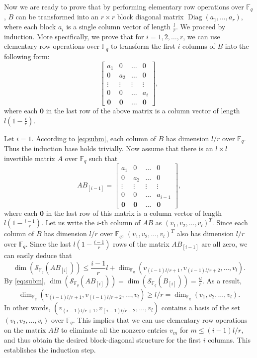 \documentclass[11pt,onecolumn]{IEEEtran}
\newcommand{\cS}{\mathcal{S}}
\DeclareMathOperator{\Diag}{Diag}
\begin{document}
Now we are ready to prove that by performing elementary row operations over $\mathbb{F}_q$, $B$ can be transformed into an $r\times r$ block diagonal matrix $\Diag(a_1,\dots,a_r)$, where each block $a_i$ is a single column vector of length $\frac{l}{r}$. 
We proceed by induction.
More specifically, we prove that for $i=1,2,\dots,r$, we can use elementary row operations over $\mathbb{F}_q$ to transform the first $i$ columns of $B$ into the following form:
$$
\left[
\begin{array}{cccc}
a_1 & 0 & \dots & 0 \\
0 & a_2 & \dots & 0 \\
\vdots & \vdots & \vdots & \vdots \\
0 & 0 & \dots & a_i \\
\mathbf{0} & \mathbf{0} & \dots & \mathbf{0}
\end{array}
\right],
$$
where each $\mathbf{0}$ in the last row of the above matrix is a column vector of length $l(1-\frac{i}{r})$.

Let $i=1.$ According to \eqref{eq:subm}, each column of $B$ has dimension $l/r$ over $\mathbb{F}_q$. Thus the induction base holds trivially.
Now assume that there is an $l \times l$ invertible matrix $A$ over $\mathbb{F}_q$ such that
$$
A B_{[i-1]}=
\left[
\begin{array}{cccc}
a_1 & 0 & \dots & 0 \\
0 & a_2 & \dots & 0 \\
\vdots & \vdots & \vdots & \vdots \\
0 & 0 & \dots & a_{i-1} \\
\mathbf{0} & \mathbf{0} & \dots & \mathbf{0}
\end{array}
\right],
$$
where each $\mathbf{0}$ in the last row of this matrix is a column vector of length $l(1-\frac{i-1}{r})$.
Let us write the $i$-th column of $AB$ as $(v_1,v_2,\dots,v_l)^T$. 
Since each column of $B$ has dimension $l/r$ over $\mathbb{F}_q$,
$(v_1,v_2,\dots,v_l)^T$ also has dimension $l/r$ over $\mathbb{F}_q$.
Since the last $l(1-\frac{i-1}{r})$ rows of the matrix $A B_{[i-1]}$ are all zero, we can easily deduce that 
   $$
\dim(\cS_{\mathbb{F}_q}(AB_{[i]})) \le \frac{i-1}{r}l + 
\dim_{\mathbb{F}_q}(v_{(i-1)l/r+1}, v_{(i-1)l/r+2}, \dots, v_l).
   $$
By \eqref{eq:subm}, $\dim(\cS_{\mathbb{F}_q}(AB_{[i]}))=\dim(\cS_{\mathbb{F}_q}(B_{[i]}))=\frac{il}{r}$. 
As a result, 
$$
\dim_{\mathbb{F}_q}(v_{(i-1)l/r+1}, v_{(i-1)l/r+2}, \dots, v_l) \ge l/r = 
\dim_{\mathbb{F}_q}(v_1,v_2, \dots, v_l).
$$
In other words, $(v_{(i-1)l/r+1}, v_{(i-1)l/r+2}, \dots, v_l)$ contains a basis of the set $(v_1,v_2, \dots, v_l)$ over $\mathbb{F}_q$.
This implies that we can use elementary row operations on the matrix $AB$ to eliminate all the nonzero entries
$v_m$ for $m\le (i-1)l/r$, and thus obtain the desired block-diagonal structure for the first $i$ columns.
This establishes the induction step.
\end{document}
